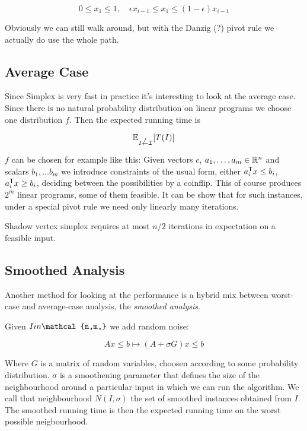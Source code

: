 \[0\leq x_1 \leq 1, \quad \epsilon x_{i-1} \leq x_1 \leq (1-\epsilon)x_{i-1}\]

Obviously we can still walk around, but with the Danzig (?) pivot rule we actually do use the whole path.

\subsection{Average Case}

Since Simplex is very fast in practice it's interesting to look at the average case. Since there is no natural probability distribution on linear programs we choose one distribution $f$. Then the expected running time is

\[\mathbb{E}_{I \stackrel{f}{\leftarrow}\mathcal{I}}[T(I)]\]

$f$ can be chosen for example like this: Given vectors $c$, $a_1,\ldots, a_m\in \mathbb{R}^n$ and scalars $b_1,\ldots b_m$ we introduce constraints of the usual form, either ${a}^\text{\upshape \sffamily T}_i x \leq b_i$, ${a}^\text{\upshape \sffamily T}_ix\geq b_i$, deciding between the possibilities by a coinflip. This of course produces $2^m$ linear programs, some of them feasible. It can be show that for such instances, under a special pivot rule we need only linearly many iterations.

\begin{thm}[Haimich '83] Shadow vertex simplex requires at most $n/2$ iterations in expectation on a feasible input.\end{thm}


\subsection{Smoothed Analysis}

Another method for looking at the performance is a hybrid mix between worst-case and average-case analysis, the \emph{smoothed analysis}.

Given $I\\in \mathcal{n,m,}$ we add random noise:

\[Ax\leq b \mapsto (A+\sigma G)x\leq b\]

Where $G$ is a matrix of random variables, choosen according to some probability distribution. $\sigma$ is a smoothening parameter that defines the size of the neighbourhood around a particular input in which we can run the algorithm. We call that neighbourhood $N(I,\sigma)$ the set of smoothed instances obtained from $I$. The smoothed running time is then the expected running time on the worst possible neigbourhood.

